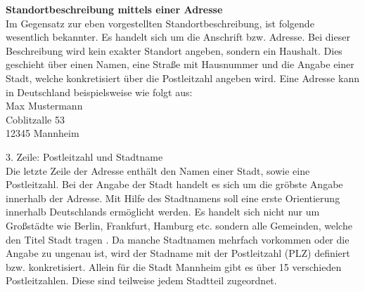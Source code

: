 \textbf{Standortbeschreibung mittels einer Adresse}
\\Im Gegensatz zur eben vorgestellten Standortbeschreibung, ist folgende wesentlich bekannter. Es handelt sich um die Anschrift bzw. Adresse. Bei dieser Beschreibung wird kein exakter Standort angeben, sondern ein Haushalt. Dies geschieht über einen Namen, eine Straße mit Hausnummer und die Angabe einer Stadt, welche konkretisiert über die Postleitzahl angeben wird.  
Eine Adresse kann in Deutschland beispielsweise wie folgt aus:
\\Max Mustermann 
\\Coblitzalle 53
\\12345 Mannheim


3. Zeile: Postleitzahl und Stadtname
\\Die letzte Zeile der Adresse enthält den Namen einer Stadt, sowie eine Postleitzahl. Bei der Angabe der Stadt handelt es sich um die gröbste Angabe innerhalb der Adresse. Mit Hilfe des Stadtnamens soll eine erste Orientierung innerhalb Deutschlands ermöglicht werden. Es handelt sich nicht nur um Großstädte wie Berlin, Frankfurt, Hamburg etc. sondern alle Gemeinden, welche den Titel Stadt tragen .
Da manche Stadtnamen mehrfach vorkommen oder die Angabe zu ungenau ist, wird der Stadname mit der Postleitzahl (PLZ) definiert bzw. konkretisiert. Allein für die Stadt Mannheim gibt es über 15 verschieden Postleitzahlen. Diese sind teilweise jedem Stadtteil zugeordnet.

